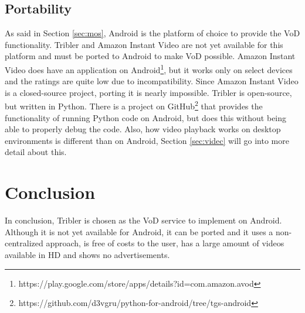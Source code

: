 \subsection{Portability}
As said in Section \ref{sec:mos}, Android is the platform of choice to provide the VoD functionality. Tribler and Amazon Instant Video are not yet available for this platform and must be ported to Android to make VoD possible. Amazon Instant Video does have an application on Android\footnote{https://play.google.com/store/apps/details?id=com.amazon.avod}, but it works only on select devices and the ratings are quite low due to incompatibility. Since Amazon Instant Video is a closed-source project, porting it is nearly impossible. Tribler is open-source, but written in Python. There is a project on GitHub\footnote{https://github.com/d3vgru/python-for-android/tree/tgs-android} that provides the functionality of running Python code on Android, but does this without being able to properly debug the code. Also, how video playback works on desktop environments is different than on Android, Section \ref{sec:videc} will go into more detail about this.
\section{Conclusion}
In conclusion, Tribler is chosen as the VoD service to implement on Android. Although it is not yet available for Android, it can be ported and it uses a non-centralized approach, is free of costs to the user, has a large amount of videos available in HD and shows no advertisements.